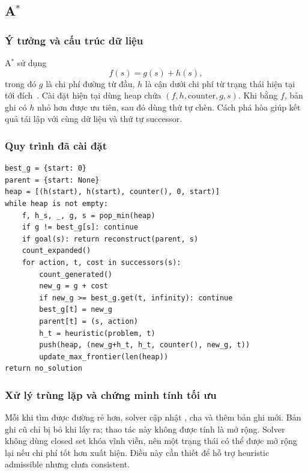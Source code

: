 \documentclass[a4paper]{article}
\newcommand{\tep}[1]{{\small\ttfamily\detokenize{#1}}}
\newcommand{\astar}{\texorpdfstring{A\ensuremath{^*}}{A*}}
\begin{document}
\subsection{\astar{}}
\subsubsection{Ý tưởng và cấu trúc dữ liệu}
\astar{} sử dụng
\begin{equation}
f(s)=g(s)+h(s),
\end{equation}
trong đó $g$ là chi phí đường từ đầu, $h$ là cận dưới chi phí từ trạng thái hiện tại tới đích~\cite{hart1968}. Cài đặt hiện tại dùng heap chứa $(f,h,\mathrm{counter},g,s)$. Khi bằng $f$, bản ghi có $h$ nhỏ hơn được ưu tiên, sau đó dùng thứ tự chèn. Cách phá hòa giúp kết quả tái lập với cùng dữ liệu và thứ tự successor.

\subsubsection{Quy trình đã cài đặt}
\par\noindent\begin{minipage}{\textwidth}
\begin{lstlisting}[caption={Mã giả phản ánh vòng lặp trong astar\_solver.py.}]
best_g = {start: 0}
parent = {start: None}
heap = [(h(start), h(start), counter(), 0, start)]
while heap is not empty:
    f, h_s, _, g, s = pop_min(heap)
    if g != best_g[s]: continue
    if goal(s): return reconstruct(parent, s)
    count_expanded()
    for action, t, cost in successors(s):
        count_generated()
        new_g = g + cost
        if new_g >= best_g.get(t, infinity): continue
        best_g[t] = new_g
        parent[t] = (s, action)
        h_t = heuristic(problem, t)
        push(heap, (new_g+h_t, h_t, counter(), new_g, t))
        update_max_frontier(len(heap))
return no_solution
\end{lstlisting}
\end{minipage}\par\medskip

\subsubsection{Xử lý trùng lặp và chứng minh tính tối ưu}
Mỗi khi tìm được đường rẻ hơn, solver cập nhật \tep{best_g}, cha và thêm bản ghi mới. Bản ghi cũ chỉ bị bỏ khi lấy ra; thao tác này không được tính là mở rộng. Solver không dùng closed set khóa vĩnh viễn, nên một trạng thái có thể được mở rộng lại nếu chi phí tốt hơn xuất hiện. Điều này cần thiết để hỗ trợ heuristic admissible nhưng chưa consistent.
\end{document}
